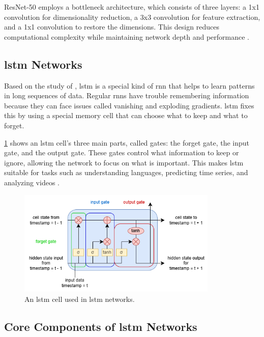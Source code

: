 \begin{refsection}
ResNet-50 employs a bottleneck architecture, which consists of three layers: a 1x1 convolution for dimensionality reduction, a 3x3 convolution for feature extraction, and a 1x1 convolution to restore the dimensions. This design reduces computational complexity while maintaining network depth and performance \cite{he2015deepresiduallearningimage}.

\subsection{\gls{lstm} Networks}

Based on the study of \citeauthor{10.1162/neco.1997.9.1.1} \citeyear{10.1162/neco.1997.9.1.1}, \gls{lstm} is a special kind of \gls{rnn} that helps to learn patterns in long sequences of data. Regular \gls{rnn}s have trouble remembering information because they can face issues called vanishing and exploding gradients. \gls{lstm} fixes this by using a special memory cell that can choose what to keep and what to forget.

\ref{fig:secondFig} shows an \gls{lstm} cell's three main parts, called gates: the forget gate, the input gate, and the output gate. These gates control what information to keep or ignore, allowing the network to focus on what is important. This makes \gls{lstm} suitable for tasks such as understanding languages, predicting time series, and analyzing videos \cite{10.1162/neco.1997.9.1.1}.

\begin{figure}[H]
    \centering
	\includegraphics[width=0.85\textwidth]{figures/lstm.png} 
	\caption[An \gls{lstm} Cell]{An \gls{lstm} cell used in \gls{lstm} networks.}
	\label{fig:secondFig}
\end{figure}

\subsection{Core Components of \gls{lstm} Networks}


\end{refsection}
